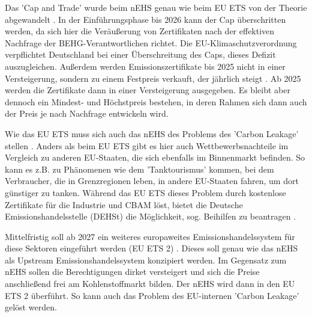 Das 'Cap and Trade' wurde beim nEHS genau wie beim EU ETS von der Theorie abgewandelt \cite{dehst.2023}.
In der Einführungsphase bis 2026 kann der Cap überschritten werden, da sich hier die Veräußerung von Zertifikaten nach der effektiven Nachfrage der BEHG-Verantwortlichen richtet.
Die EU-Klimaschutzverordnung verpflichtet Deutschland bei einer Überschreitung des Caps, dieses Defizit auszugleichen. 
Außerdem werden Emissionszertifikate bis 2025 nicht in einer Versteigerung, sondern zu einem Festpreis verkauft, der jährlich steigt \cite{dehst.2023} .
Ab 2025 werden die Zertifikate dann in einer Versteigerung ausgegeben.
Es bleibt aber dennoch ein Mindest- und Höchstpreis bestehen, in deren Rahmen sich dann auch der Preis je nach Nachfrage entwickeln wird.

Wie das EU ETS muss sich auch das nEHS des Problems des 'Carbon Leakage' stellen \cite{dehst2.2023}. 
Anders als beim EU ETS gibt es hier auch Wettbewerbsnachteile im Vergleich zu anderen EU-Staaten, die sich ebenfalls im Binnenmarkt befinden.
So kann es z.B. zu Phänomenen wie dem 'Tanktourismus' kommen, bei dem Verbraucher, die in Grenzregionen leben, in andere EU-Staaten fahren, um dort günstiger zu tanken.
Während das EU ETS dieses Problem durch kostenlose Zertifikate für die Industrie und CBAM löst, bietet die Deutsche Emissionshandelsstelle (DEHSt) die Möglichkeit, sog. Beihilfen zu beantragen \cite{dehst2.2023}.

Mittelfristig soll ab 2027 ein weiteres europaweites Emissionshandelssystem für diese Sektoren eingeführt werden (EU ETS 2) \cite{ub.2023}.
Dieses soll genau wie das nEHS als Upstream Emissionshandelssystem konzipiert werden. Im Gegensatz zum nEHS sollen die Berechtigungen dirket versteigert und sich die Preise anschließend frei am Kohlenstoffmarkt bilden. 
Der nEHS wird dann in den EU ETS 2 überführt. So kann auch das Problem des EU-internen 'Carbon Leakage' gelöst werden.
